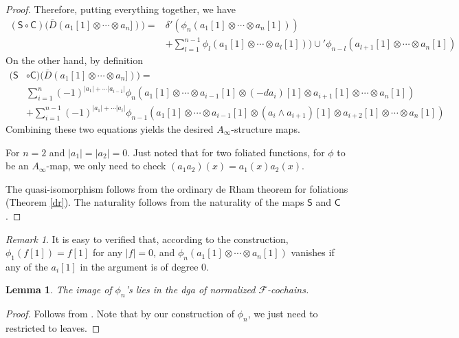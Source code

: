 \documentclass[12pt]{amsart}
\newtheorem{lem}[thm]{Lemma}
\theoremstyle{definition}
\theoremstyle{remark}
\newtheorem{rem}[thm]{Remark}
\numberwithin{equation}{section}
\newcommand{\CF}{{\mathcal F}}
\newcommand{\1}{{\mathbb{1}}}
\begin{document}
\begin{proof}
    Therefore, putting everything together, we have
    \begin{align*}
        (\mathsf{S}\circ \mathsf{C})\big(\overline{D}(a_1[1]\otimes \cdots \otimes a_n])\big)=& \delta'(\phi_n(a_1[1]\otimes \cdots \otimes a_n[1])) \\
        &+\sum_{l=1}^{n-1}\phi_l(a_1[1]\otimes \cdots \otimes a_l[1]))\cup' \phi_{n-l}(a_{l+1}[1]\otimes \cdots \otimes a_n[1])
    \end{align*}
    On the other hand, by definition
    \begin{align*}
        (\mathsf{S}&\circ \mathsf{C})\big(\overline{D}(a_1[1]\otimes \cdots \otimes a_n])\big)=\\
        &\sum_{i=1}^n (-1)^{|a_1|+\cdots |a_{i-1}|}\phi_n(a_1[1]\otimes\cdots\otimes a_{i-1}[1] \otimes (-da_i)[1]\otimes a_{i+1}[1]\otimes\cdots\otimes a_n[1])\\
        &+\sum_{i=1}^{n-1} (-1)^{|a_1|+\cdots |a_{i}|}\phi_{n-1}(a_1[1]\otimes\cdots\otimes a_{i-1}[1] \otimes (a_i\wedge a_{i+1})[1]\otimes a_{i+2}[1]\otimes\cdots\otimes a_n[1])
    \end{align*}
    Combining these two equations yields the desired $A_{\infty}$-structure maps.
    
    For $n=2$ and $|a_1| = |a_2| = 0$. Just noted that for two foliated functions, for $\phi$ to be an $A_{\infty}$-map, we only need to check $(a_1a_2)(x) = a_1(x)a_2(x)$.
    
    The quasi-isomorphism follows from the ordinary de Rham theorem for foliations (Theorem \ref{dr}). The naturality follows from the naturality of the maps $\mathsf{S}$ and $\mathsf{C}$.
    
\end{proof}

\begin{rem}
    It is easy to verified that, according to the construction,
    $\phi_1(f[1]) = f[1]$ for any $|f| = 0$, and $\phi_n(a_1[1]\otimes \cdots \otimes a_n[1])$ vanishes if any of the $a_i[1]$ in the argument is of degree 0.
\end{rem}

\begin{lem}
    The image of $\phi_n$'s lies in the dga of normalized $\CF$-cochains.                  
\end{lem}
\begin{proof}
Follows from \cite[Proposition 3.26]{AS12}. Note that by our construction of $\phi_n$, we just need to restricted to leaves.
\end{proof}
\end{document}
